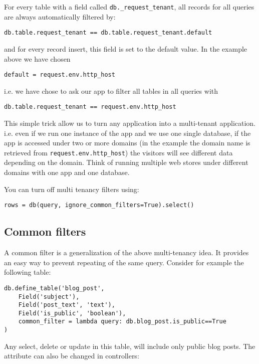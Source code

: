 \documentclass[justified,sixbynine,notoc]{tufte-book}
\def\ft{\small\tt}
\def\inxx#1{\index{#1}}
\begin{document}
\begin{fullwidth}
For every table with a field called {\ft db.\_request\_tenant}, all records for all queries are always automatically filtered by:

\begin{lstlisting}
db.table.request_tenant == db.table.request_tenant.default
\end{lstlisting}
\noindent and for every record insert, this field is set to the default value.
In the example above we have chosen
\begin{lstlisting}
default = request.env.http_host
\end{lstlisting}
i.e. we have chose to ask our app to filter all tables in all queries with
\begin{lstlisting}
db.table.request_tenant == request.env.http_host
\end{lstlisting}

This simple trick allow us to turn any application into a multi-tenant application. i.e. even if we run one instance of the app and we use one single database, if the app is accessed under two or more domains (in the example the domain name is retrieved from {\ft request.env.http\_host}) the visitors will see different data depending on the domain. Think of running multiple web stores under different domains with one app and one database.

You can turn off multi tenancy filters using: \inxx{ignore\_common\_filters}
\begin{lstlisting}
rows = db(query, ignore_common_filters=True).select()
\end{lstlisting}

\goodbreak\subsection{Common filters}

A common filter is a generalization of the above multi-tenancy idea.
It provides an easy way to prevent repeating of the same query.
Consider for example the following table:

\begin{lstlisting}
db.define_table('blog_post',
    Field('subject'),
    Field('post_text', 'text'),
    Field('is_public', 'boolean'),
    common_filter = lambda query: db.blog_post.is_public==True
)
\end{lstlisting}

Any select, delete or update in this table, will include only public blog posts. The attribute can also be changed in controllers:


\end{fullwidth}
\end{document}
